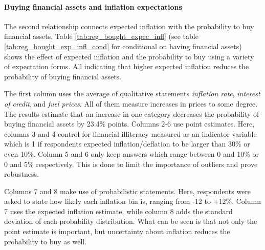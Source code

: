 \documentclass[ProjectABM]{subfiles}
\begin{document}



\paragraph{Buying financial assets and inflation expectations}
The second relationship connects expected inflation with the probability to buy financial assets. %
Table \ref{tab:reg_bought_expec_infl} (see table \ref{tab:reg_bought_exp_infl_cond} for conditional on having financial assets) shows the effect of expected inflation and the probability to buy using a variety of expectation forms. All indicating that higher expected inflation reduces the probability of buying financial assets.

The first column uses the average of qualitative statements \textit{inflation rate}, \textit{interest of credit}, and \textit{fuel prices}. All of them measure increases in prices to some degree. The results estimate that an increase in one category decreases the probability of buying financial assets by 23.4\% points. Columns 2-6 use point estimates. Here, columns 3 and 4 control for financial illiteracy measured as an indicator variable which is 1 if respondents expected inflation/deflation to be larger than 30\% or even 10\%. Column 5 and 6 only keep answers which range between 0 and 10\% or 0 and 5\% respectively. This is done to limit the importance of outliers and prove robustness.

Columns 7 and 8 make use of probabilistic statements. Here, respondents were asked to state how likely each inflation bin is, ranging from -12 to +12\%. Column 7 uses the expected inflation estimate, while column 8 adds the standard deviation of each probability distribution. What can be seen is that not only the point estimate is important, but uncertainty about inflation reduces the probability to buy as well. %
\end{document}
